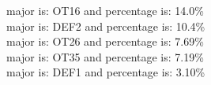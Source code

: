 major is: OT16 and percentage is: 14.0\% \\
major is: DEF2 and percentage is: 10.4\% \\
major is: OT26 and percentage is: 7.69\% \\
major is: OT35 and percentage is: 7.19\% \\
major is: DEF1 and percentage is: 3.10\% \\
